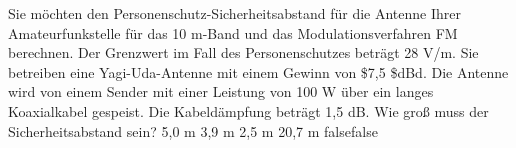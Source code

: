     {Sie möchten den Personenschutz-Sicherheitsabstand für die Antenne Ihrer Amateurfunkstelle für das 10 m-Band und das Modulationsverfahren FM berechnen. Der Grenzwert im Fall des Personenschutzes beträgt 28 V/m. Sie betreiben eine Yagi-Uda-Antenne mit einem Gewinn von \$7,5 \$dBd. Die Antenne wird von einem Sender mit einer Leistung von 100 W über ein langes Koaxialkabel gespeist. Die Kabeldämpfung beträgt 1,5 dB. Wie groß muss der Sicherheitsabstand sein?}
    {5,0 m}
    {3,9 m}
    {2,5 m}
    {20,7 m}
    {false}{false}